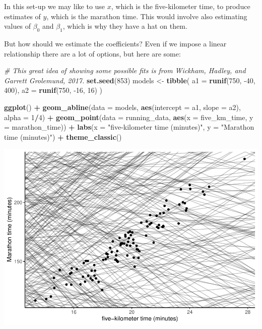\documentclass[
]{book}
\newenvironment{Shaded}{\begin{snugshade}}{\end{snugshade}}
\newcommand{\CommentTok}[1]{\textcolor[rgb]{0.56,0.35,0.01}{\textit{#1}}}
\newcommand{\DataTypeTok}[1]{\textcolor[rgb]{0.13,0.29,0.53}{#1}}
\newcommand{\DecValTok}[1]{\textcolor[rgb]{0.00,0.00,0.81}{#1}}
\newcommand{\KeywordTok}[1]{\textcolor[rgb]{0.13,0.29,0.53}{\textbf{#1}}}
\newcommand{\NormalTok}[1]{#1}
\newcommand{\OperatorTok}[1]{\textcolor[rgb]{0.81,0.36,0.00}{\textbf{#1}}}
\newcommand{\StringTok}[1]{\textcolor[rgb]{0.31,0.60,0.02}{#1}}
\begin{document}
In this set-up we may like to use \(x\), which is the five-kilometer time, to produce estimates of \(y\), which is the marathon time. This would involve also estimating values of \(\beta_0\) and \(\beta_1\), which is why they have a hat on them.

But how should we estimate the coefficients? Even if we impose a linear relationship there are a lot of options, but here are some:

\begin{Shaded}
\begin{Highlighting}[]
\CommentTok{# This great idea of showing some possible fits is from Wickham, Hadley, and Garrett Grolemund, 2017.}
\KeywordTok{set.seed}\NormalTok{(}\DecValTok{853}\NormalTok{)}
\NormalTok{models <-}\StringTok{ }\KeywordTok{tibble}\NormalTok{(}
  \DataTypeTok{a1 =} \KeywordTok{runif}\NormalTok{(}\DecValTok{750}\NormalTok{, }\DecValTok{-40}\NormalTok{, }\DecValTok{400}\NormalTok{),}
  \DataTypeTok{a2 =} \KeywordTok{runif}\NormalTok{(}\DecValTok{750}\NormalTok{, }\DecValTok{-16}\NormalTok{, }\DecValTok{16}\NormalTok{)}
\NormalTok{  )}

\KeywordTok{ggplot}\NormalTok{() }\OperatorTok{+}\StringTok{ }
\StringTok{  }\KeywordTok{geom_abline}\NormalTok{(}\DataTypeTok{data =}\NormalTok{ models, }
              \KeywordTok{aes}\NormalTok{(}\DataTypeTok{intercept =}\NormalTok{ a1, }\DataTypeTok{slope =}\NormalTok{ a2), }
              \DataTypeTok{alpha =} \DecValTok{1}\OperatorTok{/}\DecValTok{4}\NormalTok{) }\OperatorTok{+}
\StringTok{  }\KeywordTok{geom_point}\NormalTok{(}\DataTypeTok{data =}\NormalTok{ running_data, }\KeywordTok{aes}\NormalTok{(}\DataTypeTok{x =}\NormalTok{ five_km_time, }
                                      \DataTypeTok{y =}\NormalTok{ marathon_time)) }\OperatorTok{+}
\StringTok{  }\KeywordTok{labs}\NormalTok{(}\DataTypeTok{x =} \StringTok{"five-kilometer time (minutes)"}\NormalTok{,}
       \DataTypeTok{y =} \StringTok{"Marathon time (minutes)"}\NormalTok{) }\OperatorTok{+}
\StringTok{  }\KeywordTok{theme_classic}\NormalTok{()}
\end{Highlighting}
\end{Shaded}

\includegraphics{telling_stories_with_data_files/figure-latex/unnamed-chunk-349-1.pdf}
\end{document}
